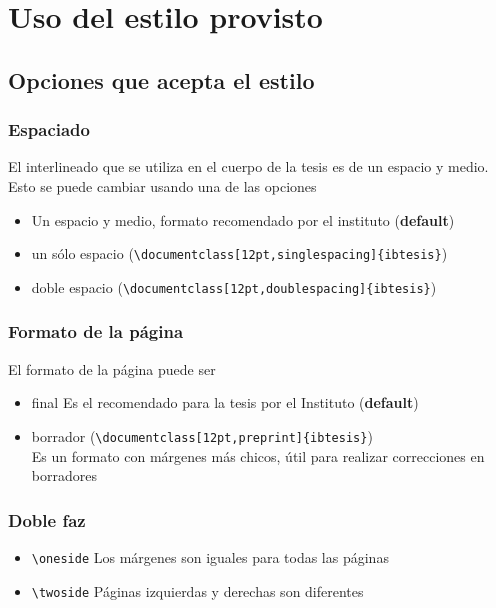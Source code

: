 \chapter{Uso del estilo provisto}

\graphicspath{{figs/cap1/}{figs/comunes/}}

\section{Opciones que acepta el estilo}
\label{S:opciones-que-acepta}

\subsection*{Espaciado}
El interlineado que se utiliza en el cuerpo de la tesis es de un espacio y medio. Esto se puede cambiar usando una de las opciones
\begin{itemize}
\item Un espacio y medio, formato recomendado por el instituto (\textbf{default})
\item un s\'{o}lo espacio (\verb|\documentclass[12pt,singlespacing]{ibtesis}|) 
\item doble espacio (\verb|\documentclass[12pt,doublespacing]{ibtesis}|)
\end{itemize}

\subsection*{Formato de la p\'{a}gina}
El formato de la p\'{a}gina puede ser
\begin{itemize}
\item final Es el recomendado para la tesis por el Instituto (\textbf{default})
\item borrador (\verb|\documentclass[12pt,preprint]{ibtesis}|)\\ Es un formato con m\'{a}rgenes m\'{a}s chicos, \'{u}til para realizar correcciones en borradores 
\end{itemize}

\subsection*{Doble faz}
\label{S:doble-faz}

\begin{itemize}
\item \verb|\oneside| Los m\'{a}rgenes son iguales para todas las p\'{a}ginas
\item \verb|\twoside| P\'{a}ginas izquierdas y derechas son diferentes
\end{itemize}

